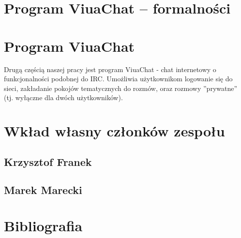 \documentclass[11pt,oneside,a4paper,titlepage,onecolumn]{book}
\begin{document}






\chapter{Program ViuaChat -- formalności}



\chapter{Program ViuaChat}
\label{program_viuachat}

Drugą częścią naszej pracy jest program ViuaChat - chat internetowy o funkcjonalności podobnej do IRC.
Umożliwia użytkownikom logowanie się do sieci, zakładanie pokojów tematycznych do rozmów, oraz rozmowy
''prywatne'' (tj. wyłączne dla dwóch użytkowników).





\chapter{Wkład własny członków zespołu}
\label{wklad_wlasny_czlonkow_zespolu}

\section{Krzysztof Franek}

\section{Marek Marecki}



\chapter{Bibliografia}
\end{document}
